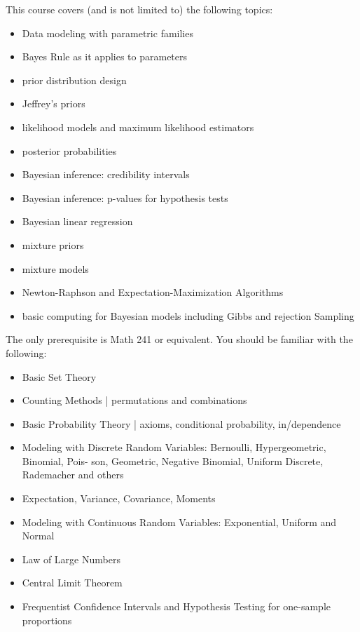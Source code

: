\documentclass[12pt]{article}
\begin{document}
This course covers (and is not limited to) the following topics:


\begin{itemize}
\itemsep -0.0em 
\item Data modeling with parametric families
\item Bayes Rule as it applies to parameters
\item prior distribution design 
\item Jeffrey's priors 
\item likelihood models and maximum likelihood estimators
\item posterior probabilities 
\item Bayesian inference: credibility intervals 
\item Bayesian inference: p-values for hypothesis tests
\item Bayesian linear regression
\item mixture priors 
\item mixture models
\item Newton-Raphson and Expectation-Maximization Algorithms
\item basic computing for Bayesian models including Gibbs and rejection Sampling 
\end{itemize}

\noindent The only prerequisite is Math 241 or equivalent. You should be familiar with the following:

\begin{itemize}
\itemsep -0.0em 
\item Basic Set Theory
\item Counting Methods | permutations and combinations
\item  Basic Probability Theory | axioms, conditional probability, in/dependence
\item Modeling with Discrete Random Variables: Bernoulli, Hypergeometric, Binomial, Pois-
son, Geometric, Negative Binomial, Uniform Discrete, Rademacher and others
\item Expectation, Variance, Covariance, Moments
\item Modeling with Continuous Random Variables: Exponential, Uniform and Normal
\item Law of Large Numbers
\item Central Limit Theorem
\item Frequentist Confidence Intervals and Hypothesis Testing for one-sample proportions
\end{itemize}
\end{document}
